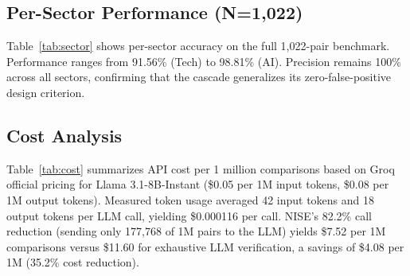 \documentclass[conference]{IEEEtran}
\begin{document}
\subsection{Per-Sector Performance (N=1,022)}
Table~\ref{tab:sector} shows per-sector accuracy on the full 1,022-pair benchmark.
Performance ranges from 91.56\% (Tech) to 98.81\% (AI).
Precision remains 100\% across all sectors, confirming that the cascade generalizes its zero-false-positive design criterion.

\begin{table}[!t]
\centering
\caption{Per-Sector NISE Cascade Performance (N=1,022)}
\label{tab:sector}
\end{table}

\subsection{Cost Analysis}
Table~\ref{tab:cost} summarizes API cost per 1 million comparisons based on Groq official pricing for Llama 3.1-8B-Instant (\$0.05 per 1M input tokens, \$0.08 per 1M output tokens).
Measured token usage averaged 42 input tokens and 18 output tokens per LLM call, yielding \$0.000116 per call.
NISE's 82.2\% call reduction (sending only 177,768 of 1M pairs to the LLM) yields \$7.52 per 1M comparisons versus \$11.60 for exhaustive LLM verification, a savings of \$4.08 per 1M (35.2\% cost reduction).
\end{document}
